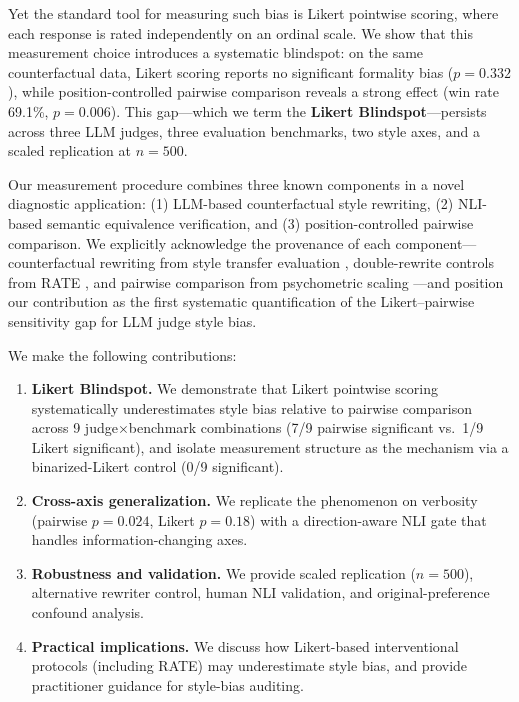 \documentclass[11pt]{article}
\begin{document}
Yet the standard tool for measuring such bias is Likert pointwise scoring, where each response is rated independently on an ordinal scale.
We show that this measurement choice introduces a systematic blindspot: on the same counterfactual data, Likert scoring reports no significant formality bias ($p = 0.332$), while position-controlled pairwise comparison reveals a strong effect (win rate 69.1\%, $p = 0.006$).
This gap---which we term the \textbf{Likert Blindspot}---persists across three LLM judges, three evaluation benchmarks, two style axes, and a scaled replication at $n = 500$.

Our measurement procedure combines three known components in a novel diagnostic application: (1) LLM-based counterfactual style rewriting, (2) NLI-based semantic equivalence verification, and (3) position-controlled pairwise comparison.
We explicitly acknowledge the provenance of each component---counterfactual rewriting from style transfer evaluation \cite{mir2019evaluating,krishna2020reformulating}, double-rewrite controls from RATE \cite{feuer2025rate}, and pairwise comparison from psychometric scaling \cite{thurstone1927law}---and position our contribution as the first systematic quantification of the Likert--pairwise sensitivity gap for LLM judge style bias.

We make the following contributions:
\begin{enumerate}
    \item \textbf{Likert Blindspot.} We demonstrate that Likert pointwise scoring systematically underestimates style bias relative to pairwise comparison across 9 judge$\times$benchmark combinations (7/9 pairwise significant vs.\ 1/9 Likert significant), and isolate measurement structure as the mechanism via a binarized-Likert control (0/9 significant).
    \item \textbf{Cross-axis generalization.} We replicate the phenomenon on verbosity (pairwise $p = 0.024$, Likert $p = 0.18$) with a direction-aware NLI gate that handles information-changing axes.
    \item \textbf{Robustness and validation.} We provide scaled replication ($n = 500$), alternative rewriter control, human NLI validation, and original-preference confound analysis.
    \item \textbf{Practical implications.} We discuss how Likert-based interventional protocols (including RATE) may underestimate style bias, and provide practitioner guidance for style-bias auditing.
\end{enumerate}
\end{document}
